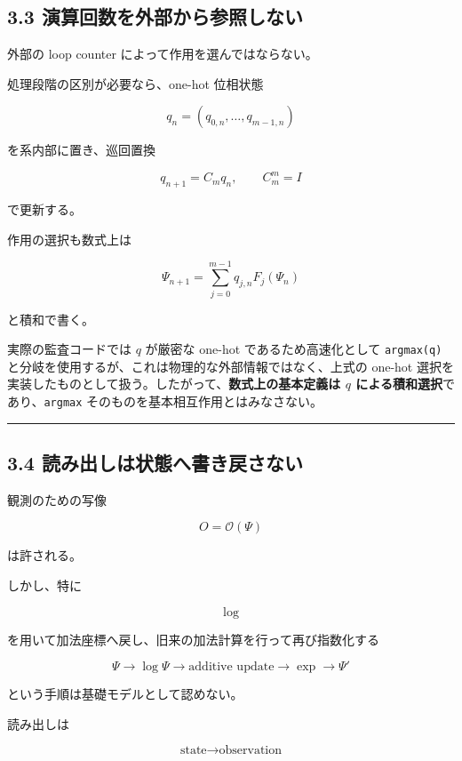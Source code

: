 \documentclass[
  a4paper,
]{ltjsarticle}
\begin{document}
\subsection{3.3
演算回数を外部から参照しない}\label{ux6f14ux7b97ux56deux6570ux3092ux5916ux90e8ux304bux3089ux53c2ux7167ux3057ux306aux3044}

外部の loop counter によって作用を選んではならない。

処理段階の区別が必要なら、one-hot 位相状態

\[
q_n=(q_{0,n},\ldots,q_{m-1,n})
\]

を系内部に置き、巡回置換

\[
\boxed{
q_{n+1}=C_m q_n,
\qquad C_m^m=I
}
\]

で更新する。

作用の選択も数式上は

\[
\boxed{
\Psi_{n+1}
=
\sum_{j=0}^{m-1} q_{j,n}F_j(\Psi_n)
}
\]

と積和で書く。

実際の監査コードでは \(q\) が厳密な one-hot であるため高速化として
\texttt{argmax(q)}
と分岐を使用するが、これは物理的な外部情報ではなく、上式の one-hot
選択を実装したものとして扱う。したがって、\textbf{数式上の基本定義は
\(q\) による積和選択}であり、\texttt{argmax}
そのものを基本相互作用とはみなさない。

\begin{center}\rule{0.5\linewidth}{0.5pt}\end{center}

\subsection{3.4
読み出しは状態へ書き戻さない}\label{ux8aadux307fux51faux3057ux306fux72b6ux614bux3078ux66f8ux304dux623bux3055ux306aux3044}

観測のための写像

\[
O=\mathcal O(\Psi)
\]

は許される。

しかし、特に

\[
\log
\]

を用いて加法座標へ戻し、旧来の加法計算を行って再び指数化する

\[
\Psi
\rightarrow
\log\Psi
\rightarrow
\text{additive update}
\rightarrow
\exp
\rightarrow
\Psi'
\]

という手順は基礎モデルとして認めない。

読み出しは

\[
\boxed{
\text{state}\rightarrow\text{observation}
}
\]
\end{document}

